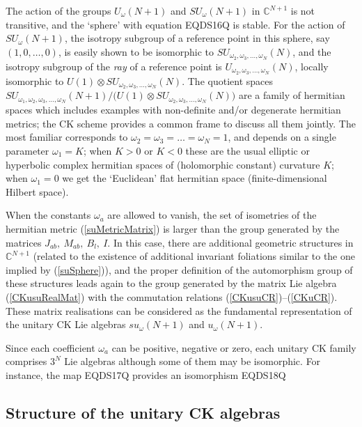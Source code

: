\documentclass[12pt]{article}
\begin{document}
The action of the groups $U_{\omega}(N+1)$ and $SU_{\omega}(N+1)$ in
${{\mathbb C}}^{N+1}$ is not transitive, and the `sphere' with equation
EQDS16Q
is stable. For the action of
$SU_{\omega}(N+1)$, the isotropy subgroup of a reference point in this
sphere, say $(1, 0, \dots, 0)$, is easily shown to be isomorphic to
$SU_{{\omega}_2,{\omega}_3, \dots, {\omega}_N}(N)$, and the isotropy subgroup of the
\emph{ray} of a reference point is
$U_{{\omega}_2,{\omega}_3, \dots, {\omega}_N}(N)$, locally isomorphic to $U(1) \otimes
SU_{{\omega}_2,{\omega}_3,
\dots, {\omega}_N}(N)$. The quotient spaces
$SU_{{\omega}_1, {\omega}_2, {\omega}_3, \dots, {\omega}_N}(N+1)/\big( U(1) \otimes SU_{{\omega}_2,{\omega}_3,
\dots, {\omega}_N}(N) \big) $ are a family of  hermitian spaces which
includes examples with non-definite and/or
degenerate hermitian metrics; the CK scheme provides a common frame to discuss
all them jointly. The most familiar corresponds to ${\omega}_2={\omega}_3=\dots={\omega}_N=1$,
and depends on a single parameter ${\omega}_1=K$; when $K>0$ or $K<0$ these
are the usual elliptic or hyperbolic complex hermitian spaces of (holomorphic
constant) curvature $K$; when ${\omega}_1=0$ we get
the `Euclidean' flat hermitian space (finite-dimensional Hilbert space).

When the constants ${\omega}_a$ are allowed to vanish, the set of
isometries of the hermitian metric (\ref{suMetricMatrix}) is larger
than the group generated by the matrices
${J}_{ab},\ {M}_{ab},\ {B}_l,\ {I}$. In this case, there are additional
geometric structures in ${{\mathbb C}}^{N+1}$ (related to the existence of
additional invariant foliations similar to the one implied by
(\ref{suSphere})), and the proper definition of the automorphism
group of these structures leads again to the group generated by the
matrix Lie algebra (\ref{CKusuRealMat}) with the commutation relations
 (\ref{CKusuCR})--(\ref{CKuCR}). These matrix
realisations can be considered as the fundamental representation of
the  unitary CK Lie algebras
$su_{\omega}(N+1)$ and $u_{\omega}(N+1)$.

Since each coefficient ${\omega}_a$ can be positive, negative or zero,
each unitary CK family comprises  $3^N$ Lie algebras  although some of
them may be isomorphic. For instance, the map
EQDS17Q
provides an isomorphism
EQDS18Q

\subsection{Structure of the unitary CK algebras}
\end{document}
